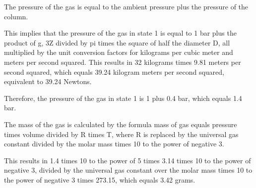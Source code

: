 The pressure of the gas is equal to the ambient pressure plus the pressure of the column.

This implies that the pressure of the gas in state 1 is equal to 1 bar plus the product of g, 3Z divided by pi times the square of half the diameter D, all multiplied by the unit conversion factors for kilograms per cubic meter and meters per second squared. This results in 32 kilograms times 9.81 meters per second squared, which equals 39.24 kilogram meters per second squared, equivalent to 39.24 Newtons.

Therefore, the pressure of the gas in state 1 is 1 plus 0.4 bar, which equals 1.4 bar.

The mass of the gas is calculated by the formula mass of gas equals pressure times volume divided by R times T, where R is replaced by the universal gas constant divided by the molar mass times 10 to the power of negative 3.

This results in 1.4 times 10 to the power of 5 times 3.14 times 10 to the power of negative 3, divided by the universal gas constant over the molar mass times 10 to the power of negative 3 times 273.15, which equals 3.42 grams.